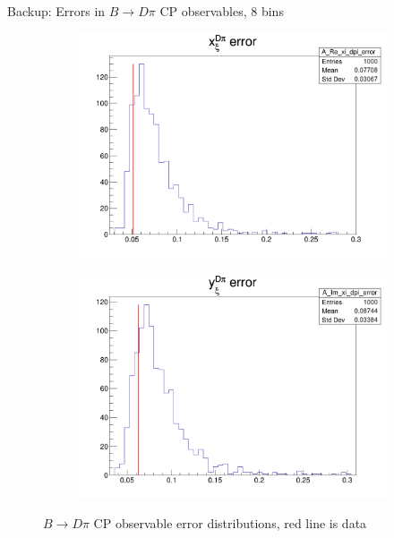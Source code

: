\documentclass{beamer}
\begin{document}
\begin{frame}{Backup: Errors in $B\to D\pi$ CP observables, $8$ bins}
  \begin{figure}
    \centering
    \vspace{-0.2cm}
    \begin{subfigure}{0.5\textwidth}
      \includegraphics[width = 1.0\textwidth]{A_Re_xi_dpi_8Bins_error.png}
    \end{subfigure}%
    \begin{subfigure}{0.5\textwidth}
      \includegraphics[width = 1.0\textwidth]{A_Im_xi_dpi_8Bins_error.png}
    \end{subfigure}
    \caption{$B\to D\pi$ CP observable error distributions, red line is data}
  \end{figure}
\end{frame}
\end{document}

